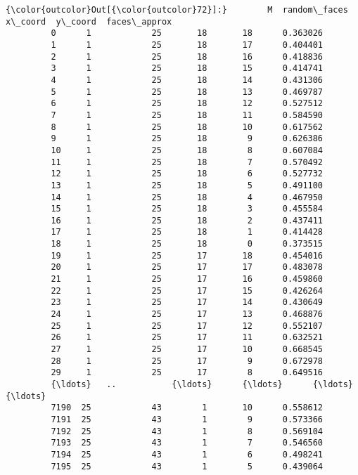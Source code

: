 \documentclass[11pt]{article}
\begin{document}
\begin{Verbatim}[commandchars=\\\{\}]
{\color{outcolor}Out[{\color{outcolor}72}]:}        M  random\_faces  x\_coord  y\_coord  faces\_approx
         0      1            25       18       18      0.363026
         1      1            25       18       17      0.404401
         2      1            25       18       16      0.418836
         3      1            25       18       15      0.414741
         4      1            25       18       14      0.431306
         5      1            25       18       13      0.469787
         6      1            25       18       12      0.527512
         7      1            25       18       11      0.584590
         8      1            25       18       10      0.617562
         9      1            25       18        9      0.626386
         10     1            25       18        8      0.607084
         11     1            25       18        7      0.570492
         12     1            25       18        6      0.527732
         13     1            25       18        5      0.491100
         14     1            25       18        4      0.467950
         15     1            25       18        3      0.455584
         16     1            25       18        2      0.437411
         17     1            25       18        1      0.414428
         18     1            25       18        0      0.373515
         19     1            25       17       18      0.454016
         20     1            25       17       17      0.483078
         21     1            25       17       16      0.459860
         22     1            25       17       15      0.426264
         23     1            25       17       14      0.430649
         24     1            25       17       13      0.468876
         25     1            25       17       12      0.552107
         26     1            25       17       11      0.632521
         27     1            25       17       10      0.668545
         28     1            25       17        9      0.672978
         29     1            25       17        8      0.649516
         {\ldots}   ..           {\ldots}      {\ldots}      {\ldots}           {\ldots}
         7190  25            43        1       10      0.558612
         7191  25            43        1        9      0.573366
         7192  25            43        1        8      0.569104
         7193  25            43        1        7      0.546560
         7194  25            43        1        6      0.498241
         7195  25            43        1        5      0.439064

\end{Verbatim}
\end{document}
